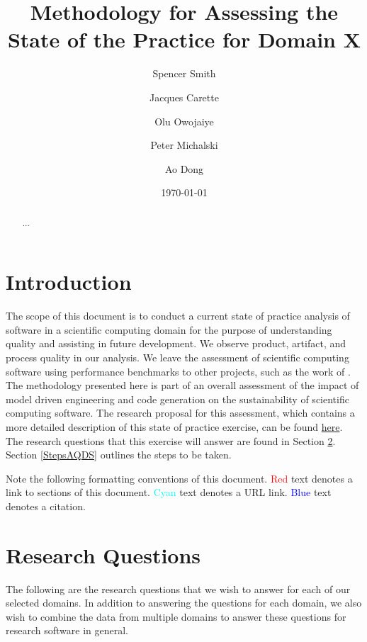 \documentclass[letterpaper,cleveref]{lipics-v2019}
\title{Methodology for Assessing the State of the Practice for Domain X}
\author{Spencer Smith}{McMaster University, Canada}{smiths@mcmaster.ca}{}{}
\author{Jacques Carette}{McMaster University, Canada}{carette@mcmaster.ca}{}{}
\author{Olu Owojaiye}{McMaster University, Canada}{owojaiyo@mcmaster.ca}{}{}
\author{Peter Michalski}{McMaster University, Canada}{michap@mcmaster.ca}{}{}
\author{Ao Dong}{McMaster University, Canada}{donga9@mcmaster.ca}{}{}
\date{\today}
\theoremstyle{definition}
\begin{document}
\maketitle

\begin{abstract}
	...
\end{abstract}

\tableofcontents

\section{Introduction} \label{SecIntroduction}

The scope of this document is to conduct a current state of practice analysis of
software in a scientific computing domain for the purpose of understanding
quality and assisting in future development. We observe product, artifact, and
process quality in our analysis. We leave the assessment of scientific computing
software using performance benchmarks to other projects, such as the work of
\cite{kaagstrom1998gemm}. The methodology presented here is part of an overall
assessment of the impact of model driven engineering and code generation on the
sustainability of scientific computing software. The research proposal for this
assessment, which contains a more detailed description of this state of practice
exercise, can be found
\href{https://github.com/smiths/AIMSS/blob/master/OverallResearchProposal/ResearchProposal.pdf}{here}. The
research questions that this exercise will answer are found in Section
\ref{ResearchQuestions}. Section \ref{StepsAQDS} outlines the steps to be taken.
 
Note the following formatting conventions of this document. \textcolor{red}{Red}
text denotes a link to sections of this document. \textcolor{cyan}{Cyan}
text denotes a URL link. \textcolor{blue}{Blue} text denotes a citation.

\section{Research Questions}\label{ResearchQuestions}

The following are the research questions that we wish to answer for each of our
selected domains.  In addition to answering the questions for each domain, we
also wish to combine the data from multiple domains to answer these questions
for research software in general.
\end{document}
